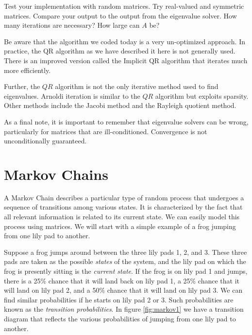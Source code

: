 \begin{problem}
Test your implementation with random matrices.
Try real-valued and symmetric matrices.
Compare your output to the output from the eigenvalue solver.
How many iterations are necessary?
How large can $A$ be?
\end{problem}

Be aware that the algorithm we coded today is a very un-optimized approach.
In practice, the QR algorithm as we have described it here is not generally used.
There is an improved version called the Implicit QR algorithm that iterates much more efficiently.

Further, the $QR$ algorithm is not the only iterative method used to find eigenvalues.
Arnoldi iteration is similar to the $QR$ algorithm but exploits sparsity.
Other methods include the Jacobi method and the Rayleigh quotient method.

As a final note, it is important to remember that eigenvalue solvers can be wrong, particularly for matrices that are ill-conditioned. Convergence is not unconditionally guaranteed. 

\section*{Markov Chains}
A Markov Chain describes a particular type of random process that
undergoes a sequence of transitions among various states. It is
characterized by the fact that all relevant information is related to its current state.
We can easily model this process using matrices.
We will start with a simple example of a frog jumping from one lily pad to another.

Suppose a frog jumps around between the three lily pads 1, 2, and 3.
These three pads are taken as the possible \emph{states} of the system, and the
lily pad on which the frog is presently sitting is the \emph{current state}.
If the frog is on lily pad 1 and jumps, there is a 25\% chance that it will land back on lily pad 1, a 25\% chance that it will land on lily pad 2, and a 50\% chance that it will land on lily pad 3.
We can find similar probabilities if he starts on lily pad 2 or 3.
Such probabilities are known as the \emph{transition probabilities}.
In figure \ref{fig:markov1} we have a transition diagram that reflects the various probabilities of jumping from one lily pad to another.

